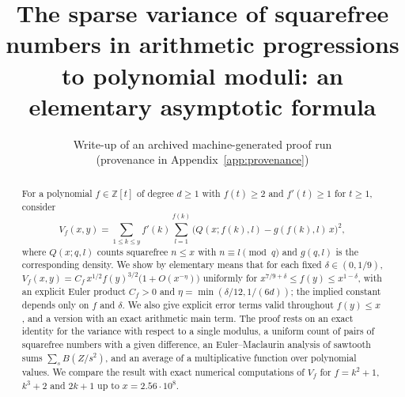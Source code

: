 \documentclass[11pt]{article}
\title{The sparse variance of squarefree numbers in arithmetic progressions to polynomial moduli: an elementary asymptotic formula}
\author{Write-up of an archived machine-generated proof run\\(provenance in Appendix~\ref{app:provenance})}
\date{}
\numberwithin{equation}{section}
\newcommand{\Z}{\mathbb{Z}}
\begin{document}
\maketitle

\begin{abstract}
For a polynomial $f\in\Z[t]$ of degree $d\ge1$ with $f(t)\ge2$ and $f'(t)\ge1$ for $t\ge1$, consider
\[
V_f(x,y)=\sum_{1\le k\le y}f'(k)\sum_{l=1}^{f(k)}\bigl(Q(x;f(k),l)-g(f(k),l)\,x\bigr)^2,
\]
where $Q(x;q,l)$ counts squarefree $n\le x$ with $n\equiv l\pmod q$ and $g(q,l)$ is the corresponding density.
We show by elementary means that
for each fixed $\delta\in(0,1/9)$, $V_f(x,y)=C_f\,x^{1/2}f(y)^{3/2}\bigl(1+O(x^{-\eta})\bigr)$ uniformly for $x^{7/9+\delta}\le f(y)\le x^{1-\delta}$, with an explicit Euler product $C_f>0$ and $\eta=\min(\delta/12,1/(6d))$; the implied constant depends only on $f$ and $\delta$.
We also give explicit error terms valid throughout $f(y)\le x$, and a version with an exact arithmetic main term.
The proof rests on an exact identity for the variance with respect to a single modulus, a uniform count of pairs of squarefree numbers with a given difference, an Euler--Maclaurin analysis of sawtooth sums $\sum_s B(Z/s^2)$, and an average of a multiplicative function over polynomial values.
We compare the result with exact numerical computations of $V_f$ for $f=k^2+1$, $k^3+2$ and $2k+1$ up to $x=2.56\cdot10^8$.
\end{abstract}

\tableofcontents












\clearpage



\appendix


\end{document}
